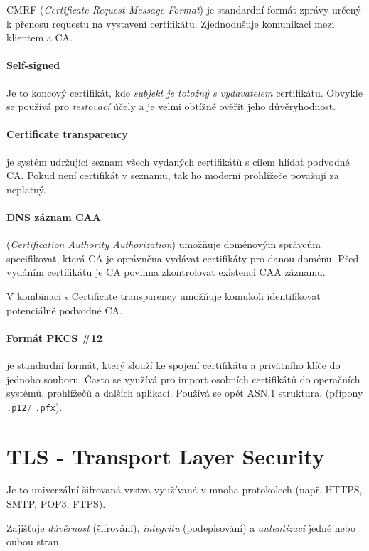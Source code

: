 \documentclass[10pt,a4paper]{article}
\begin{document}
CMRF (\textit{Certificate Request Message Format}) je standardní formát zprávy určený k přenosu requestu na vystavení certifikátu. Zjednodušuje komunikaci mezi klientem a CA.


\paragraph{Self-signed} Je to koncový certifikát, kde \textit{subjekt je totožný s vydavatelem} certifikátu. Obvykle se používá pro \textit{testovací} účely a je velmi obtížné ověřit jeho důvěryhodnost.


\paragraph{Certificate transparency} je systém udržující seznam všech vydaných certifikátů s cílem hlídat podvodné CA. Pokud není certifikát v seznamu, tak ho moderní prohlížeče považují za neplatný.


\paragraph{DNS záznam CAA} (\textit{Certification Authority Authorization}) umožňuje doménovým správcům specifikovat, která CA je oprávněna vydávat certifikáty pro danou doménu. Před vydáním certifikátu je CA povinna zkontrolovat existenci CAA záznamu. 

V kombinaci s Certificate transparency umožňuje komukoli identifikovat potenciálně podvodné CA.

\paragraph{Formát PKCS \#12} je standardní formát, který slouží ke spojení certifikátu a privátního klíče do jednoho souboru. 
Často se využívá pro import osobních certifikátů do operačních systémů, prohlížečů a dalších aplikací. 
Používá se opět ASN.1 struktura. (přípony \texttt{.p12}/ \texttt{.pfx}).




\section{TLS - Transport Layer Security}
Je to univerzální šifrovaná vrstva využívaná v mnoha protokolech (např. HTTPS, SMTP, POP3, FTPS).

Zajišťuje \textit{důvěrnost} (šifrování), \textit{integritu} (podepisování) a \textit{autentizaci} jedné nebo oubou stran.
\end{document}
